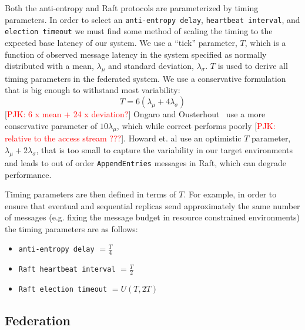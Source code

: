 \documentclass[10pt,conference,letterpaper]{IEEEtran}
\newcommand{\todo}[1]{{\textcolor{red}{#1}}}
\newcommand{\pjk}[1]{[\todo{PJK: #1}]}
\begin{document}
Both the anti-entropy and Raft protocols are parameterized by timing parameters.
In order to select an \texttt{anti-entropy delay}, \texttt{heartbeat
interval}, and \texttt{election timeout} we must find some method of
scaling the timing to the expected base latency of our system.
We use a ``tick'' parameter, $T$, which is a function of
observed message latency in the system specified as normally
distributed with a mean, $\lambda_{\mu}$ and standard deviation,
$\lambda_{\sigma}$.
$T$ is used to derive all timing parameters in the federated system.
We use a conservative formulation that is
big enough to withstand most variability:
\begin{equation}
    T = 6(\lambda_{\mu} + 4\lambda_{\sigma})
\end{equation} 
\pjk{6 x mean + 24 x deviation?} 
Ongaro and Ousterhout~\cite{ongaro_search_2014} use a more conservative
parameter of $10\lambda_{\mu}$, which while correct performs poorly \pjk{relative to the
access stream ???}.
Howard et.
al \cite{howard_raft_2015} use an
optimistic $T$ parameter, $\lambda_{\mu} + 2\lambda_{\sigma}$, that is too small to capture
the variability in our target environments and leads to out of order
\texttt{AppendEntries} messages in Raft, which can degrade performance.

Timing parameters are then defined in terms of $T$.
For example, in order to ensure that eventual and sequential replicas send approximately
the same number of messages (e.g.
fixing the message budget in resource constrained environments) the timing
parameters are as follows:
\begin{itemize}
    \item \texttt{anti-entropy delay} $= \frac{T}{4}$
    \item \texttt{Raft heartbeat interval} $= \frac{T}{2}$
    \item \texttt{Raft election timeout} $= U(T, 2T)$
\end{itemize}


\subsection{Federation}
\end{document}
